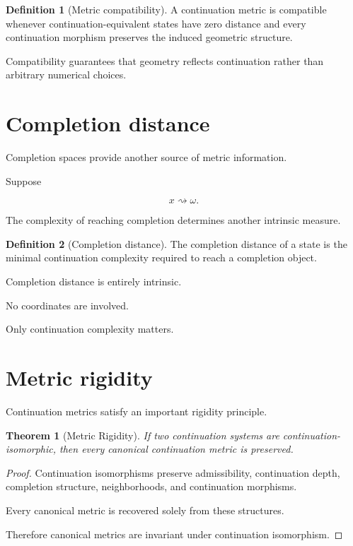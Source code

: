 \documentclass[13pt,openany]{book}
\theoremstyle{plain}
\newtheorem{theorem}{Theorem}[chapter]
\theoremstyle{definition}
\newtheorem{definition}{Definition}[chapter]
\begin{document}
\begin{definition}[Metric compatibility]
A continuation metric is compatible whenever continuation-equivalent states have zero distance and every continuation morphism preserves the induced geometric structure.
\end{definition}

Compatibility guarantees that geometry reflects continuation rather than arbitrary numerical choices.


\section{Completion distance}

Completion spaces provide another source of metric information.

Suppose

\[
x
\rightsquigarrow
\omega .
\]

The complexity of reaching completion determines another intrinsic measure.

\begin{definition}[Completion distance]
The completion distance of a state is the minimal continuation complexity required to reach a completion object.
\end{definition}

Completion distance is entirely intrinsic.

No coordinates are involved.

Only continuation complexity matters.


\section{Metric rigidity}

Continuation metrics satisfy an important rigidity principle.

\begin{theorem}[Metric Rigidity]
If two continuation systems are continuation-isomorphic, then every canonical continuation metric is preserved.
\end{theorem}

\begin{proof}
Continuation isomorphisms preserve admissibility, continuation depth, completion structure, neighborhoods, and continuation morphisms.

Every canonical metric is recovered solely from these structures.

Therefore canonical metrics are invariant under continuation isomorphism.
\end{proof}
\end{document}
